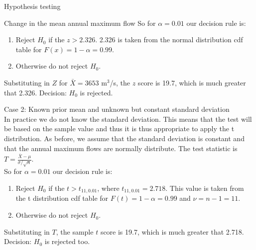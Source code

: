 \documentclass[8pt]{beamer}
\renewcommand{\emph}[1]{\textcolor{myorange}{#1}}
\begin{document}
\begin{frame}{Hypothesis testing}

    \begin{exampleblock}{Change in  the mean annual maximum flow}
   So for $\alpha = 0.01$ our decision rule is:
    \begin{enumerate}
        \item \emph{Reject} $H_0$ if the $z > 2.326$. 2.326 is taken from the \emph{normal distribution cdf} table for $F(x) = 1-\alpha = 0.99$.
        \item Otherwise \emph{do not reject} $H_0$. 
    \end{enumerate}
    Substituting in $Z$ for $\bar{X} = 3653$ m$^3$/s, the $z$ score is 19.7, which is much greater that 2.326. \emph{Decision: $H_0$ is rejected}.

    \alert{Case 2: Known prior mean and unknown but constant standard deviation}\\
    In practice we do not know the standard deviation. This means that the test will be based on the sample value and thus it is thus appropriate to apply the \emph{t distribution}. As before, we assume that the standard deviation is constant and that the annual maximum flows are \emph{normally distribute}. The \emph{test statistic} is $T = \frac{\bar{X}-\mu}{\sigma/\sqrt{n}}$.\\
   So for $\alpha = 0.01$ our decision rule is:
    \begin{enumerate}
        \item \emph{Reject} $H_0$ if the $t > t_{11,0.01}$, where $t_{11,0.01} =  2.718$. This value is taken from the \emph{t distribution cdf} table for $F(t) = 1-\alpha = 0.99$ and $\nu=n-1=11$. 
        \item Otherwise \emph{do not reject} $H_0$. 
    \end{enumerate}
    Substituting in $T$, the sample $t$ score is 19.7, which is much greater that 2.718. \emph{Decision: $H_0$ is rejected too}.
    \end{exampleblock}

\end{frame}
\end{document}
